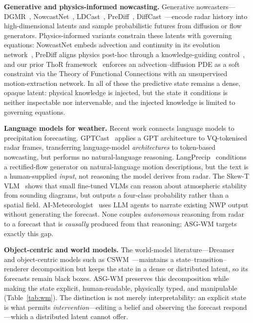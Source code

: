 \documentclass[fleqn,10pt]{wlscirep}
\begin{document}
\textbf{Generative and physics-informed nowcasting.}
Generative nowcasters---DGMR~\cite{ravuri2021dgmr}, NowcastNet~\cite{zhang2023nowcastnet}, LDCast~\cite{leinonen2023ldcast}, PreDiff~\cite{gao2023prediff}, DiffCast~\cite{yu2024diffcast}---encode radar history into high-dimensional latents and sample probabilistic futures from diffusion or flow generators.
Physics-informed variants constrain these latents with governing equations: NowcastNet embeds advection and continuity in its evolution network~\cite{zhang2023nowcastnet}, PreDiff aligns physics post-hoc through a knowledge-guiding control~\cite{gao2023prediff}, and our prior ThoR framework~\cite{ta2025thor} enforces an advection--diffusion PDE as a soft constraint via the Theory of Functional Connections with an unsupervised motion-extraction network.
In all of these the predictive state remains a dense, opaque latent: physical knowledge is injected, but the state it conditions is neither inspectable nor intervenable, and the injected knowledge is limited to governing equations.

\textbf{Language models for weather.}
Recent work connects language models to precipitation forecasting.
GPTCast~\cite{franch2025gptcast} applies a GPT architecture to VQ-tokenised radar frames, transferring language-model \emph{architectures} to token-based nowcasting, but performs no natural-language reasoning.
LangPrecip~\cite{ling2025langprecip} conditions a rectified-flow generator on natural-language motion descriptions, but the text is a human-supplied \emph{input}, not reasoning the model derives from radar.
The Skew-T VLM~\cite{lee2025skewt} shows that small fine-tuned VLMs can reason about atmospheric stability from sounding diagrams, but outputs a four-class probability rather than a spatial field.
AI-Meteorologist~\cite{aimeteorologist2025} uses LLM agents to narrate existing NWP output without generating the forecast.
None couples \emph{autonomous} reasoning from radar to a forecast that is \emph{causally} produced from that reasoning; ASG-WM targets exactly this gap.

\textbf{Object-centric and world models.}
The world-model literature---Dreamer~\cite{hafner2021dreamerv2,hafner2023dreamerv3} and object-centric models such as CSWM~\cite{kipf2020cswm}---maintains a state--transition--renderer decomposition but keeps the state in a dense or distributed latent, so its forecasts remain black boxes.
ASG-WM preserves this decomposition while making the state explicit, human-readable, physically typed, and manipulable (Table~\ref{tab:wm}).
The distinction is not merely interpretability: an explicit state is what permits \emph{intervention}---editing a belief and observing the forecast respond---which a distributed latent cannot offer.
\end{document}
